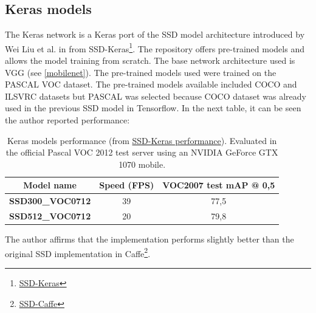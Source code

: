 \subsection{Keras models} \label{keras_models}
The Keras network is a Keras port of the SSD model architecture introduced by Wei Liu et al. in \cite{liu2016ssd} from SSD-Keras\footnote{\href{https://github.com/pierluigiferrari/ssd_keras}{SSD-Keras}}. The repository offers pre-trained models and allows the model training from scratch. The base network architecture used is VGG (see \ref{mobilenet}). The pre-trained models used were trained on the PASCAL VOC dataset. The pre-trained models available included COCO and ILSVRC datasets but PASCAL was selected because COCO dataset was already used in the previous SSD model in Tensorflow. In the next table, it can be seen the author reported performance:
\begin{table}[H]
\begin{center}
\begin{tabular}{|c|c|c|}
\hline
Model name               & Speed (FPS) & VOC2007 test mAP @ 0,5 \\ \hline
\textbf{SSD300\_VOC0712} & 39          & 77,5                   \\ \hline
\textbf{SSD512\_VOC0712} & 20          & 79,8                   \\ \hline
\end{tabular}
\end{center}
\caption{Keras models performance (from \href{https://github.com/pierluigiferrari/ssd_keras#performance}{SSD-Keras performance}). Evaluated in the official Pascal VOC 2012 test server using an NVIDIA GeForce GTX 1070 mobile.}
\end{table}
The author affirms that the implementation performs slightly better than the original SSD implementation in Caffe\footnote{\href{https://github.com/weiliu89/caffe/tree/ssd}{SSD-Caffe}}.


